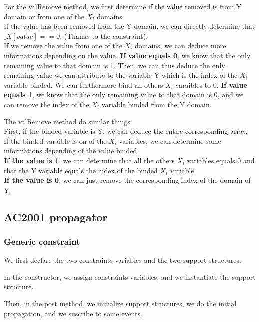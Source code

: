 \documentclass[a4paper ,12pt,french]{article}
\begin{document}
For the valRemove method, we first determine if the value removed is from Y domain or from one of the $X_i$ domains.\\
If the value has been removed  from the Y domain, we can directly determine that $\_X[value] == 0$. (Thanks to the constraint).\\
If we remove the value from one of the $X_i$ domains, we can deduce more informations depending on the value. \textbf{If value equals 0}, we know that the only remaining value to that domain is 1. Then, we can thus deduce the only remaining value we can attribute to the variable Y which is the index of the $X_i$ variable binded. We can furthermore bind all others $X_i$ varaibles to 0.  \textbf{If value equals 1}, we know that the only remaining value to that domain is 0, and we can remove the index of the $X_i$ variable binded from the Y domain.



The valRemove method do similar things.\\
First, if the binded variable is Y, we can deduce the entire corresponding array.\\
If the binded varaible is on of the $X_i$ variables, we can determine some informations depending of the value binded.\\
\textbf{If the value is 1}, we can determine that all the others $X_i$ variables equals 0 and that the Y variable equals the index of the binded $X_i$ variable. \\ \textbf{If the value is 0}, we can just remove the corresponding index of the domain of Y.


\subsection{AC2001 propagator}


\subsubsection{Generic constraint}
We first declare the two constraints variables and the two support structures.


In the constructor, we assign constraints variables, and we instantiate the support structure.


Then, in the post method, we initialize support structures, we do the initial propagation, and we suscribe to some events.

\end{document}
